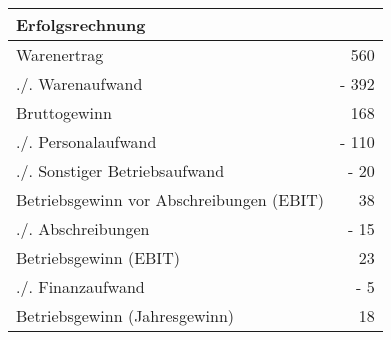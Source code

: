 \documentclass{standalone}
\begin{document}
\begin{tabular}{lr}
    \multicolumn{2}{l}{\textbf{Erfolgsrechnung}}\\
    \toprule
    Warenertrag&560\\
    ./. Warenaufwand&- 392\\
    \midrule
    Bruttogewinn&168\\
    ./. Personalaufwand&- 110\\
    ./. Sonstiger Betriebsaufwand&- 20\\
    \midrule
    Betriebsgewinn vor Abschreibungen (EBIT)&38\\
    ./. Abschreibungen&- 15\\
    \midrule
    Betriebsgewinn (EBIT)&23\\
    ./. Finanzaufwand&- 5\\
    \midrule
    Betriebsgewinn (Jahresgewinn)&18\\
    \bottomrule    
\end{tabular}
\end{document}
